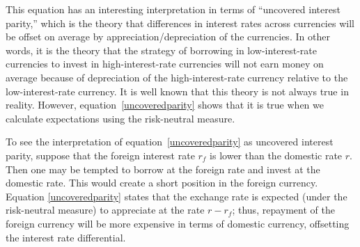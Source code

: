This equation has an interesting interpretation in terms of ``uncovered interest parity,''  which is the theory that differences in interest rates across currencies will be offset on average by appreciation/depreciation of the currencies.  In other words, it is the theory that the strategy of borrowing in low-interest-rate currencies to invest in high-interest-rate currencies will not earn money on average because of depreciation of the high-interest-rate currency relative to the low-interest-rate currency.  It is well known that this theory is not always true in reality.  However, equation~\eqref{uncoveredparity} shows that it is true when we calculate expectations using the risk-neutral measure.

To see the interpretation of equation~\eqref{uncoveredparity} as uncovered interest parity, suppose that the foreign interest rate $r_f$ is lower than the domestic rate $r$.  Then one may be tempted to borrow at the foreign rate and invest at the domestic rate.  This would create a short position in the foreign currency.  Equation \eqref{uncoveredparity} states that the exchange rate is expected (under the risk-neutral measure) to appreciate at the rate $r-r_f$; thus, repayment of the foreign currency will be more expensive in terms of domestic currency, offsetting the interest rate differential.


